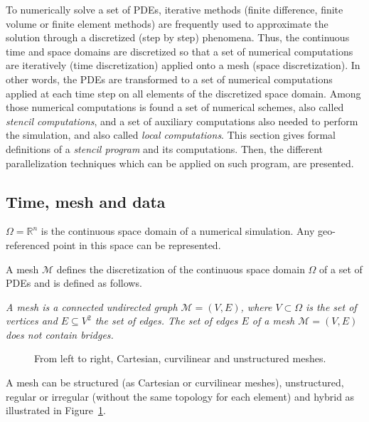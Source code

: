 To numerically solve a set of PDEs, iterative methods (finite difference, finite volume or finite element methods) are frequently used to approximate the solution through a discretized (step by step) phenomena. Thus, the continuous time and space domains are discretized so that a set of numerical computations are iteratively (time discretization) applied onto a mesh (space discretization). In other words, the PDEs are transformed to a set of numerical computations applied at each time step on all elements of the discretized space domain. Among those numerical computations is found a set of numerical schemes, also called \textit{stencil computations}, and a set of auxiliary computations also needed to perform the simulation, and also called \emph{local computations}.
This section gives formal definitions of a \textit{stencil program} and its computations. Then, the different parallelization techniques which can be applied on such program, are presented.

\subsection{Time, mesh and data}

$\Omega=\mathbb{R}^n$ is the continuous space domain of a numerical simulation. Any geo-referenced point in this space can be represented.

A mesh $\mathcal{M}$ defines the discretization of the continuous space domain $\Omega$ of a set of PDEs and is defined as follows.

\begin{mydef}
\textit{A mesh is a connected undirected graph $\mathcal{M}=(V,E)$, where $V\subset \Omega$ is the set of vertices and $E\subseteq V^2$ the set of edges. The set of edges $E$ of a mesh $\mathcal{M}=(V,E)$ does not contain bridges.}
\end{mydef}
\begin{figure}[!h]\begin{center}
  \caption{From left to right, Cartesian, curvilinear and unstructured meshes.}
  \label{fig:mesh}
\end{center}\end{figure}
A mesh can be structured (as Cartesian or curvilinear meshes), unstructured, regular or irregular (without the same topology for each element) and hybrid as illustrated in Figure~\ref{fig:mesh}.

